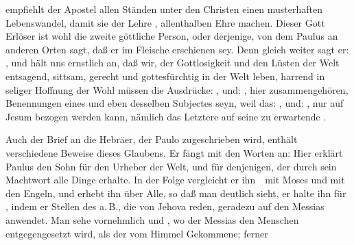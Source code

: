 \begin{aufza}
\begin{aufzc}
\item {} empfiehlt der Apostel allen Ständen unter den Christen einen musterhaften Lebenswandel, damit sie der Lehre , allenthalben Ehre machen. Dieser Gott Erlöser ist wohl die zweite göttliche Person, oder derjenige, von dem Paulus an anderen Orten sagt, daß er im Fleische erschienen sey. Denn gleich weiter sagt er: , und hält uns ernstlich an, daß wir, der Gottlosigkeit und den Lüsten der Welt entsagend, sittsam, gerecht und gottesfürchtig in der Welt leben, harrend in seliger Hoffnung der  Wohl müssen die Ausdrücke: , und: , hier zusammengehören, Benennungen eines und eben desselben Subjectes seyn, weil das: , und: , nur auf Jesum bezogen werden kann, nämlich das Letztere auf seine zu erwartende .
\item Auch der Brief an die Hebräer, der Paulo zugeschrieben wird, enthält verschiedene Beweise dieses Glaubens. Er fängt mit den Worten an:  Hier erklärt Paulus den Sohn für den Urheber der Welt, und für denjenigen, der durch sein Machtwort alle Dinge erhalte. In der Folge vergleicht er ihn~\ mit Moses und mit den Engeln, und erhebt ihn über Alle, so daß man deutlich sieht, er halte ihn für , indem er Stellen des a.\,B., die von Jehova reden, geradezu auf den Messias anwendet. Man sehe vornehmlich  und , wo der Messias den Menschen entgegengesetzt wird, als der vom Himmel Gekommene; ferner \ \ \  \uam\ 
\end{aufzc}

\end{aufza}
